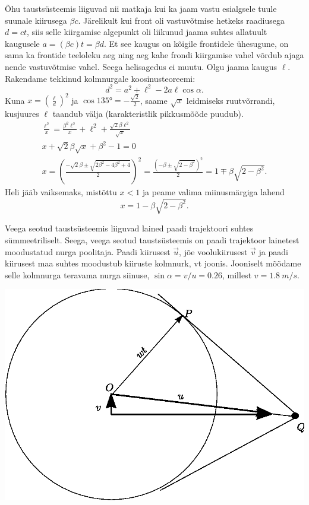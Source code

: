 \documentclass[10pt]{article}
\begin{document}
{Õhu taustsüsteemis liiguvad nii matkaja kui ka jaam vastu esialgsele tuule suunale kiirusega $\beta c$. Järelikult kui front oli vastuvõtmise hetkeks raadiusega $d = ct$, siis selle kiirgamise algepunkt oli liikunud jaama suhtes allatuult kaugusele $a = (\beta c)t = \beta d$. Et see kaugus on kõigile frontidele ühesugune, on sama ka frontide teeloleku aeg ning aeg kahe frondi kiirgamise vahel võrdub ajaga nende vastuvõtmise vahel. Seega helisagedus ei muutu. Olgu jaama kaugus $\ell$. Rakendame tekkinud kolmnurgale koosinusteoreemi:
\[
d^{2}=a^{2}+\ell^{2}-2 a \ell \cos \alpha.
\]
Kuna $x = \left(\frac{\ell}{d}\right)^2$ ja $\cos \ang{135}=-\frac{\sqrt{2}}{2}$, saame $\sqrt x$ leidmiseks ruutvõrrandi, kusjuures $\ell$ taandub välja (karakteristlik pikkusmõõde puudub).
\[
\begin{array}{c}{\frac{\ell^{2}}{x}=\frac{\beta^{2} \ell^{2}}{x}+\ell^{2}+\frac{\sqrt{2} \beta \ell^{2}}{\sqrt{x}}} \\ {x+\sqrt{2} \beta \sqrt{x}+\beta^{2}-1=0} \\ {x=\left(\frac{-\sqrt{2} \beta \pm \sqrt{2 \beta^{2}-4 \beta^{2}+4}}{2}\right)^{2}=\frac{\left(-\beta \pm \sqrt{2-\beta^{2}}\right)^{2}}{2}=1 \mp \beta \sqrt{2-\beta^{2}}.}\end{array}
\]
Heli jääb vaiksemaks, mistõttu $x < 1$ ja peame valima miinusmärgiga lahend
\[
x=1-\beta \sqrt{2-\beta^{2}}.
\]
\probend
\bigskip


\solu
\osa
Veega seotud taustsüsteemis liiguvad lained paadi trajektoori suhtes sümmeetriliselt. Seega, veega seotud taustsüsteemis on
paadi trajektoor lainetest moodustatud nurga poolitaja. Paadi kiirusest $\vec u$, jõe voolukiirusest $\vec v$ ja paadi kiirusest maa suhtes moodustub kiiruste kolmnurk, vt joonis.
Jooniselt mõõdame selle kolmnurga teravama nurga siinuse, $\sin \alpha =v/u=\num{0.26}$, millest $v=\SI{1.8}{m/s}$.

\begin{center}
	\includegraphics[width=0.8\linewidth]{2009-v3g-08-paatlah.eps}
\end{center}

}
\end{document}
